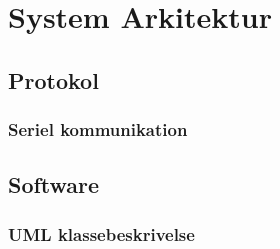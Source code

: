\chapter{System Arkitektur}

\section{Protokol}

\subsection{Seriel kommunikation}


\section{Software}

\subsection{UML klassebeskrivelse}
